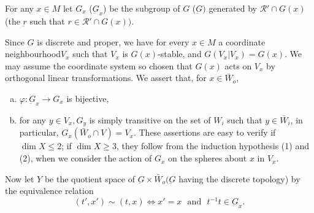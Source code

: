 {{For any $x \in M$ let $G_x$ (\resp $\underbar{G}_x$) be the subgroup of
$G$ (\resp $\underbar{G})$ generated by $\mathcal{R}' \cap
G(x)$ (\resp the $\underbar{r}$ such that $r \in \mathcal{R}' \cap
G(x))$.  

Since $G$ is discrete and proper, we have for every $x \in M$ a
coordinate neighbourhood\pageoriginale $V_x$ such that $V_x$ is $G(x)$-stable, and
$G(V_x|V_x) = G(x)$. We may assume the coordinate system so chosen
that $G(x)$ acts on $V_x$ by orthogonal linear transformations. We
assert that, for $x \in \bar{W}_o$, 
\begin{enumerate}[(a)]
\item $\varphi :\underbar{G}_x \to G_x$ is bijective,
\item for any $y \in V_x, G_y$ is simply transitive on the set of
  $W_i$ such that $y \in \bar{W}_i$, in particular, $G_x(\bar{W}_o
  \cap V) = V_x$. These assertions are easy to verify if $\dim X \leq
  2$; if $\dim X \geq 3$, they follow from the induction hypothesis
  (1) and (2), when we consider the action of $G_x$ on the spheres
  about $x$ in $V_x$. 
\end{enumerate}

Now let $Y$ be the quotient space of $\underbar{G} \times
\bar{W}_o(\underbar{G}$ having the discrete topology) by the
equivalence relation 
$$
(t',x') \sim (t,x) \Longleftrightarrow x' =x \text{~ and~ } t^{-1}t \in
  \underbar{G}_x. 
$$

}}
